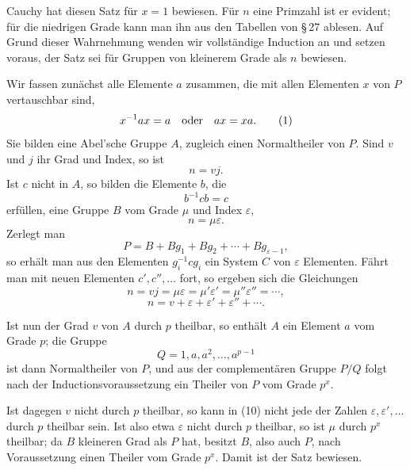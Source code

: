\documentclass[11pt]{article}
\begin{document}
Cauchy hat diesen Satz für $x=1$ bewiesen. Für $n$ eine Primzahl ist er evident; für die niedrigen Grade kann man ihn aus den Tabellen von \S\,27 ablesen. Auf Grund dieser Wahrnehmung wenden wir vollständige Induction an und setzen voraus, der Satz sei für Gruppen von kleinerem Grade als $n$ bewiesen.

Wir fassen zunächst alle Elemente $a$ zusammen, die mit allen Elementen $x$ von $P$ vertauschbar sind,
\begin{equation}
x^{-1}ax=a \quad\hbox{oder}\quad ax=xa.
\tag{1}
\end{equation}
Sie bilden eine Abel'sche Gruppe $A$, zugleich einen Normaltheiler von $P$. Sind $v$ und $j$ ihr Grad und Index, so ist
\begin{equation}
n=vj.
\tag{2}
\end{equation}
Ist $c$ nicht in $A$, so bilden die Elemente $b$, die
\begin{equation}
b^{-1}cb=c
\tag{3}
\end{equation}
erfüllen, eine Gruppe $B$ vom Grade $\mu$ und Index $\varepsilon$,
\begin{equation}
n=\mu\varepsilon.
\tag{4}
\end{equation}
Zerlegt man
\begin{equation}
P=B+Bg_1+Bg_2+\cdots+Bg_{\varepsilon-1},
\tag{6}
\end{equation}
so erhält man aus den Elementen $g_i^{-1}cg_i$ ein System $C$ von $\varepsilon$ Elementen. Fährt man mit neuen Elementen $c',c'',\ldots$ fort, so ergeben sich die Gleichungen
\begin{equation}
n=vj=\mu\varepsilon=\mu'\varepsilon'=\mu''\varepsilon''=\cdots,
\tag{9}
\end{equation}
\begin{equation}
n=v+\varepsilon+\varepsilon'+\varepsilon''+\cdots .
\tag{10}
\end{equation}

Ist nun der Grad $v$ von $A$ durch $p$ theilbar, so enthält $A$ ein Element $a$ vom Grade $p$; die Gruppe
\[
Q=1,a,a^2,\ldots,a^{p-1}
\]
ist dann Normaltheiler von $P$, und aus der complementären Gruppe $P/Q$ folgt nach der Inductionsvoraussetzung ein Theiler von $P$ vom Grade $p^x$.

Ist dagegen $v$ nicht durch $p$ theilbar, so kann in (10) nicht jede der Zahlen $\varepsilon,\varepsilon',\ldots$ durch $p$ theilbar sein. Ist also etwa $\varepsilon$ nicht durch $p$ theilbar, so ist $\mu$ durch $p^x$ theilbar; da $B$ kleineren Grad als $P$ hat, besitzt $B$, also auch $P$, nach Voraussetzung einen Theiler vom Grade $p^x$. Damit ist der Satz bewiesen.
\end{document}
